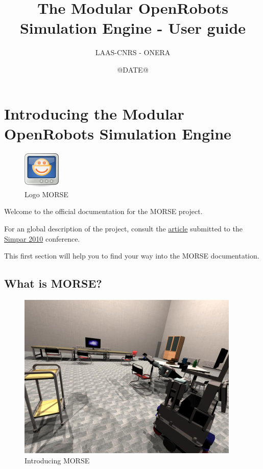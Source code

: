 \documentclass[twoside,a4paper,10pt]{report}
\title{The Modular OpenRobots Simulation Engine - User guide}
\author{LAAS-CNRS - ONERA}
\date{@DATE@}
\newcommand{\dokutitlelevelone}[1]{\chapter{#1}}
\newcommand{\dokutitleleveltwo}[1]{\section{#1}}
\begin{document}
\sffamily
\allsectionsfont{\sffamily}


\thispagestyle{empty}
\maketitle
\thispagestyle{empty}
\cleardoublepage
\tableofcontents
\newpage
\thispagestyle{plain}
\cleardoublepage
\newpage



\dokutitlelevelone{Introducing the Modular OpenRobots Simulation Engine}
\label{55d4061a5aa52cfc82c5474279f29bd9}%
\label{a80da1282f2c775bbc5f2c92c836968b}%

\begin{figure}[h]
\centering
\includegraphics[width=50pt]{openrobots-simulator.png}
\caption{Logo MORSE}
\end{figure}


Welcome to the official documentation for the MORSE project.

For an global description of the project, consult the 
\href{http://homepages.laas.fr/gechever/Documents/morse-21062010.pdf}{ article}
submitted to the \href{http://www.simpar.org/}{ Simpar 2010} conference.

This first section will help you to find your way into the MORSE documentation.


\dokutitleleveltwo{What is MORSE?}
\label{cb90401e2d53fdeab390406232e6c72f}%

\begin{figure}[h]
\raggedleft
\includegraphics[width=300pt]{simu_render_indoors.jpg}
\caption{Introducing MORSE}
\end{figure}
\end{document}
